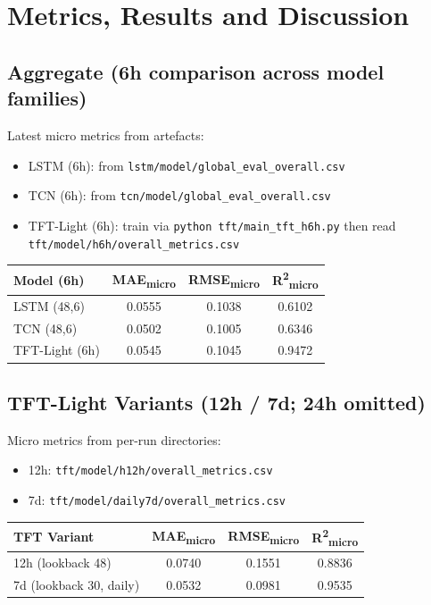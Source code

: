\documentclass[12pt,a4paper]{article}
\begin{document}
\section{Metrics, Results and Discussion}
\subsection{Aggregate (6h comparison across model families)}
\noindent Latest micro metrics from artefacts:
\begin{itemize}
    \item LSTM (6h): from \texttt{lstm/model/global\_eval\_overall.csv}
    \item TCN (6h): from \texttt{tcn/model/global\_eval\_overall.csv}
    \item TFT-Light (6h): train via \texttt{python tft/main\_tft\_h6h.py} then read \texttt{tft/model/h6h/overall\_metrics.csv}
\end{itemize}
\begin{table}[htbp]
    \centering
    \begin{tabular}{lccc}
        \toprule
        \textbf{Model (6h)} & \textbf{MAE\textsubscript{micro}} & \textbf{RMSE\textsubscript{micro}} & \textbf{R\textsuperscript{2}\textsubscript{micro}} \\
        \midrule
        LSTM (48,6) & 0.0555 & 0.1038 & 0.6102 \\
        TCN (48,6) & 0.0502 & 0.1005 & 0.6346 \\
        TFT-Light (6h) & 0.0545 & 0.1045 & 0.9472 \\
        \bottomrule
    \end{tabular}
\end{table}

\subsection{TFT-Light Variants (12h / 7d; 24h omitted)}
\noindent Micro metrics from per-run directories:
\begin{itemize}
    \item 12h: \texttt{tft/model/h12h/overall\_metrics.csv}
    \item 7d: \texttt{tft/model/daily7d/overall\_metrics.csv}
\end{itemize}
\begin{table}[htbp]
    \centering
    \begin{tabular}{lccc}
        \toprule
        \textbf{TFT Variant} & \textbf{MAE\textsubscript{micro}} & \textbf{RMSE\textsubscript{micro}} & \textbf{R\textsuperscript{2}\textsubscript{micro}} \\
        \midrule
        12h (lookback 48) & 0.0740 & 0.1551 & 0.8836 \\
        7d (lookback 30, daily) & 0.0532 & 0.0981 & 0.9535 \\
        \bottomrule
    \end{tabular}
\end{table}
\end{document}
